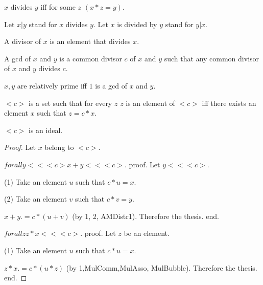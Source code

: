 \documentclass{article}
\begin{document}
\begin{forthel}

    \begin{definition}[DefDiv]
      $x$ divides $y$ iff for some $z$ $(x * z = y)$.
    \end{definition}

    Let $x | y$ stand for $x$ divides $y$.
    Let $x$ is divided by $y$ stand for $y | x$.

    \begin{definition}[DefDvs]
      A divisor of $x$ is an element that divides $x$.
    \end{definition}

    \begin{definition}[DefGCD]
      A gcd of $x$ and $y$ is a common divisor $c$ of $x$ and $y$ such that any common divisor of $x$ and $y$ divides $c$.
    \end{definition}

    \begin{definition}[DefRel]
      $x,y$ are relatively prime iff $1$ is a gcd of $x$ and $y$.
    \end{definition}


    \begin{definition}[DefPrIdeal]
      $<c>$ is a set such that for every $z$ $z$ is an element of $<c>$ iff there exists an element $x$ such that $z = c * x$.
    \end{definition}

    \begin{lemma}[PrIdeal]
      $<c>$ is an ideal.
    \end{lemma}
    \begin{proof}
      Let $x$ belong to $<c>$.

      $forall y << <c> x + y << <c>$.
      proof.
        Let $y << <c>$.

        (1) Take an element $u$ such that $c * u = x$.

        (2) Take an element $v$ such that $c * v = y$.

        $x + y .= c * (u + v)$ (by 1, 2, AMDistr1). Therefore the thesis.
      end.

    $forall z z * x << <c>$.
    proof.
      Let $z$ be an element.

      (1) Take an element $u$ such that $c * u = x$.

      $z * x .= c * (u * z)$ (by 1,MulComm,MulAsso, MulBubble). Therefore the thesis.
    end.
  \end{proof}


\end{forthel}
\end{document}

